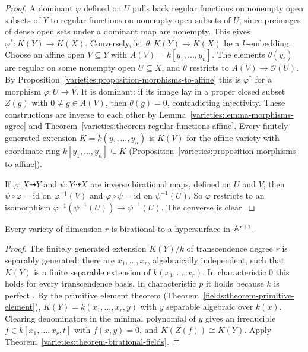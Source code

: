 \begin{proof}
A dominant $\varphi$ defined on $U$ pulls back regular functions on nonempty open subsets of $Y$ to regular functions on nonempty open
subsets of $U$, since preimages of dense open sets under a dominant map are nonempty. This gives $\varphi^* \colon K(Y) \to K(X)$. Conversely, let
$\theta \colon K(Y) \to K(X)$ be a $k$-embedding. Choose an affine open $V \subseteq Y$ with $A(V) = k[y_1, \ldots, y_n]$. The elements $\theta(y_i)$
are regular on some nonempty open $U \subseteq X$, and $\theta$ restricts to $A(V) \to \mathcal{O}(U)$. By
Proposition~\ref{varieties:proposition-morphisms-to-affine} this is $\varphi^*$ for a morphism $\varphi \colon U \to V$. It is dominant: if its
image lay in a proper closed subset $Z(g)$ with $0 \neq g \in A(V)$, then $\theta(g) = 0$, contradicting injectivity. These constructions are
inverse to each other by Lemma~\ref{varieties:lemma-morphisms-agree} and Theorem~\ref{varieties:theorem-regular-functions-affine}. Every finitely
generated extension $K = k(y_1, \ldots, y_n)$ is $K(V)$ for the affine variety with coordinate ring $k[y_1, \ldots, y_n] \subseteq K$
(Proposition~\ref{varieties:proposition-morphisms-to-affine}).

If $\varphi \colon X \dashrightarrow Y$ and $\psi \colon Y \dashrightarrow X$ are inverse birational maps, defined on $U$ and $V$, then
$\psi \circ \varphi = \mathrm{id}$ on $\varphi^{-1}(V)$ and $\varphi \circ \psi = \mathrm{id}$ on $\psi^{-1}(U)$. So $\varphi$ restricts to an
isomorphism $\varphi^{-1}(\psi^{-1}(U)) \to \psi^{-1}(U)$. The converse is clear.
\end{proof}

\begin{proposition}\label{varieties:proposition-birational-hypersurface}
Every variety of dimension $r$ is birational to a hypersurface in $\mathbb{A}^{r+1}$.
\end{proposition}

\begin{proof}
The finitely generated extension $K(Y)/k$ of transcendence degree $r$ is separably generated: there are $x_1, \ldots, x_r$, algebraically
independent, such that $K(Y)$ is a finite separable extension of $k(x_1, \ldots, x_r)$. In characteristic $0$ this holds for every transcendence
basis. In characteristic $p$ it holds because $k$ is perfect \cite[Section 26]{matsumura-crt}. By the primitive element theorem
(Theorem~\ref{fields:theorem-primitive-element}), $K(Y) = k(x_1, \ldots, x_r, y)$ with $y$ separable algebraic over $k(x)$. Clearing
denominators in the minimal polynomial of $y$ gives an irreducible $f \in k[x_1, \ldots, x_r, t]$ with $f(x, y) = 0$, and $K(Z(f)) \cong K(Y)$.
Apply Theorem~\ref{varieties:theorem-birational-fields}.
\end{proof}

